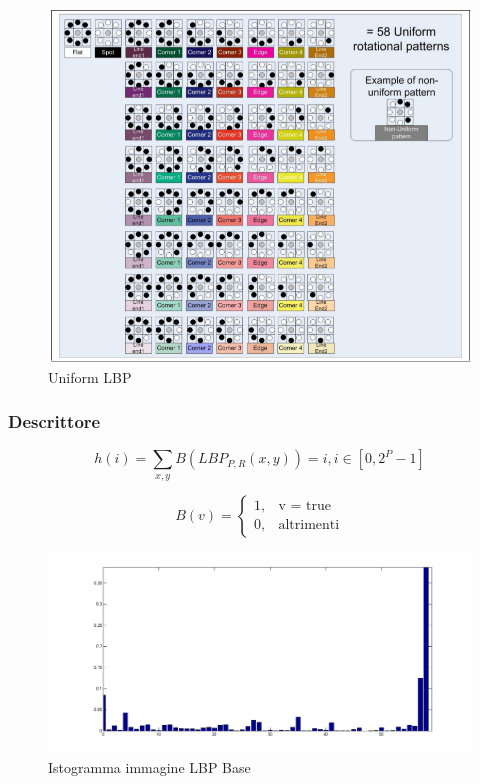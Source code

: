 \begin{figure}[ht]
\begin{center}
\includegraphics[width=.95\textwidth]{img/uniform_LBP}
\caption{ Uniform LBP }
\label{fig:uniformLBP}
\end{center}
\end{figure}

\subsubsection{Descrittore}

\begin{equation}
h(i) = \sum_{x,y} B(LBP_{P,R}(x, y)) = i, i \in  [0, 2^P-1 ]
\end{equation}

\begin{equation}
B(v) = 	\begin{cases} 1, & \mbox{v = true} \\ 0, & \mbox{altrimenti} \end{cases}
\end{equation}

\begin{figure}[ht]
\begin{center}
\includegraphics[width=.95\textwidth]{img/hist-uniform}
\caption{ Istogramma immagine LBP Base }
\label{fig:istUniformLBP}
\end{center}
\end{figure}




